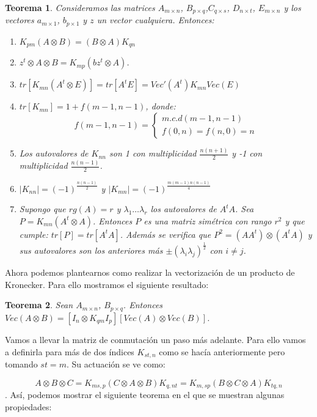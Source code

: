 \documentclass{article}
\theoremstyle{theorem-style}  %
\newtheorem{theorem}{Teorema}[section]  %
\theoremstyle{definition-style}
\theoremstyle{example-style}
\theoremstyle{exercise-style}
\begin{document}
	\begin{theorem}
		Consideramos las matrices $A_{m \times n}$, $B_{p \times q}$,$C_{q \times s}$, $D_{n \times t}$, $E_{m \times n}$ y los vectores $a_{m \times 1}$, $b_{p \times 1}$ y $z$ un vector cualquiera. Entonces:
		
		\begin{enumerate}
			\item $K_{pm}(A \otimes B) = (B \otimes A) K_{qn}$
			\item $z^t \otimes A \otimes B = K_{mp}(bz^t \otimes A)$.
			\item $tr[K_{mn}(A^t \otimes E)]=tr[A^tE]= Vec'(A^t)K_{mn}Vec(E)$
			\item $tr[K_{mn}]=1+f(m-1,n-1)$, donde:
			$$f(m-1,n-1) = \begin{cases} m.c.d(m-1, n-1)\\ f(0,n)=f(n,0)=n \end{cases} $$
			\item Los autovalores de $K_{nn}$ son 1 con multiplicidad $\frac{n(n+1)}{2}$ y -1 con multiplicidad $\frac{n(n-1)}{2}$.
			\item $|K_{nn}|= (-1)^{\frac{n(n-1)}{2}}$ y $|K_{mn}|=(-1)^{\frac{m(m-1)n(n-1)}{4}}$
			
			\item Supongo que $rg(A)=r$ y $\lambda_1 \dots \lambda_r$ los autovalores de $A^tA$. Sea $P=K_{mn}(A^t \otimes A)$. Entonces $P$ es una matriz simétrica con rango $r^2$ y que cumple: $tr[P]= tr[A^tA]$. Además se verifica que $P^2=(AA^t)\otimes(A^tA)$ y sus autovalores son los anteriores más $\pm (\lambda_i \lambda_j)^\frac{1}{2}$ con $i \neq j$.
			
		\end{enumerate} 
	\end{theorem}
	
	Ahora podemos plantearnos como realizar la vectorización de un producto de Kronecker. Para ello mostramos el siguiente resultado:
	
	\begin{theorem}
		Sean $A_{m \times n}$, $B_{p \times q}$. Entonces $Vec(A\otimes B)= [I_n \otimes K_{qm} I_p][Vec(A) \otimes Vec(B)]$. 
	\end{theorem}
	
	Vamos a llevar la matriz de conmutación un paso más adelante. Para ello vamos a definirla para más de dos índices
	$K_{st,n}$ como se hacía anteriormente pero tomando $st=m$. Su actuación se ve como:
	
	$$ A \otimes B \otimes C = K_{ms,p}(C \otimes A \otimes B)K_{q,nt} = K_{m,sp}(B \otimes C \otimes A)K_{tq,n}$$. Así, podemos mostrar el siguiente teorema en el que se muestran algunas propiedades:
	
\end{document}

